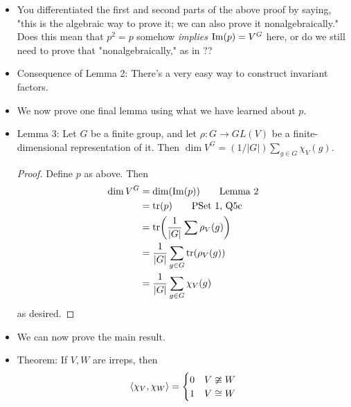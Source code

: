 \documentclass[../notes.tex]{subfiles}
\begin{document}
\begin{itemize}
\begin{proof}
        from which it follows that
        \begin{equation*}
            p(v) = \frac{1}{|G|}\sum gv \in V^G
        \end{equation*}
        as desired. To confirm that $V^G\subset\im(p)$, let $v\in V^G$. Then $gv=v$. It follows that
        \begin{equation*}
            v = \frac{1}{|G|}\sum_{g\in G}v
            = \frac{1}{|G|}\sum_{g\in G}gv
            = p(v)
            \in \im(p)
        \end{equation*}
        as desired.
    \end{proof}
    \item You differentiated the first and second parts of the above proof by saying, "this is the algebraic way to prove it; we can also prove it nonalgebraically." Does this mean that $p^2=p$ somehow \emph{implies} $\operatorname{Im}(p)=V^G$ here, or do we still need to prove that "nonalgebraically," as in \textcite{bib:FultonHarris}??
    \item Consequence of Lemma 2: There's a very easy way to construct invariant factors.
    \item We now prove one final lemma using what we have learned about $p$.
    \item Lemma 3: Let $G$ be a finite group, and let $\rho:G\to GL(V)$ be a finite-dimensional representation of it. Then $\dim V^G=(1/|G|)\sum_{g\in G}\chi_V(g)$.
    \begin{proof}
        Define $p$ as above. Then
        \begin{align*}
            \dim V^G &= \dim(\operatorname{Im}(p))\tag*{Lemma 2}\\
            &= \tr(p)\tag*{PSet 1, Q5c}\\
            &= \tr(\frac{1}{|G|}\sum\rho_V(g))\\
            &= \frac{1}{|G|}\sum_{g\in G}\tr(\rho_V(g))\\
            &= \frac{1}{|G|}\sum_{g\in G}\chi_V(g)
        \end{align*}
        as desired.
    \end{proof}
    \item We can now prove the main result.
    \item Theorem: If $V,W$ are irreps, then
    \begin{equation*}
        \inp{\chi_V,\chi_W} =
        \begin{cases}
            0 & V\ncong W\\
            1 & V\cong W
        \end{cases}

\end{equation*}
\end{itemize}
\end{document}
